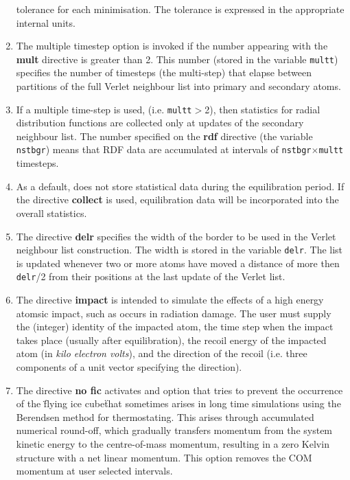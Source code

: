 \begin{enumerate}
      tolerance for each minimisation. The tolerance is expressed in
      the appropriate internal units.
\item The \D{} multiple timestep option is invoked if the number
      appearing with the {\bf mult} directive is greater than 2. This
      number (stored in the variable {\tt multt}) specifies the number
      of timesteps (the multi-step) that elapse between partitions of 
      the full Verlet neighbour list into primary and secondary atoms.
\item If a multiple time-step is used, (i.e. {\tt multt}$>$2), then
      statistics  for radial distribution functions are collected
      only at updates of the secondary neighbour list. The 
      number specified on the {\bf rdf} directive (the variable 
      {\tt nstbgr}) means that RDF data are accumulated at intervals
      of {\tt nstbgr}$\times${\tt multt} timesteps.
\item As a default, \D{} does not store statistical data during
      the equilibration period. If the directive {\bf collect} is
      used, equilibration data will be incorporated into the overall
      statistics.
\item The directive {\bf delr} specifies the width of the border to be used in
      the Verlet neighbour list construction. The
      width is stored in the variable {\tt delr}. The list is updated whenever
      two or more atoms have moved a distance of more then {\tt delr}/2 from
      their positions at the last update of the Verlet list.
\item The directive {\bf impact} is intended to simulate the effects of a high
      energy atomsic impact, such as occurs in radiation damage. The user must
      supply the (integer) identity of the impacted atom, the time step when
      the impact takes place (usually after equilibration), the recoil energy
      of the impacted atom (in {\em kilo electron volts}), and the direction
      of the recoil (i.e. three components of a unit vector specifying the
      direction).
\item The directive {\bf no fic} activates and option that tries to prevent
  the occurrence of the \"flying ice cube\" that sometimes arises in long time
  simulations using the Berendsen method for thermostating. This arises
  through accumulated numerical round-off, which gradually transfers momentum
  from the system kinetic energy to the centre-of-mass momentum, resulting in
  a zero Kelvin structure with a net linear momentum. This option removes the
  COM momentum at user selected intervals.
\end{enumerate}


